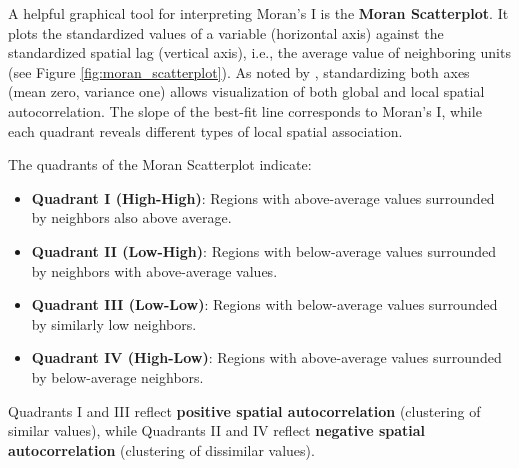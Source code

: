 A helpful graphical tool for interpreting Moran’s I is the \textbf{Moran Scatterplot}. It plots the standardized values of a variable (horizontal axis) against the standardized spatial lag (vertical axis), i.e., the average value of neighboring units (see Figure \ref{fig:moran_scatterplot}). As noted by \citet{anselin1996chapter}, standardizing both axes (mean zero, variance one) allows visualization of both global and local spatial autocorrelation. The slope of the best-fit line corresponds to Moran’s I, while each quadrant reveals different types of local spatial association.

The quadrants of the Moran Scatterplot indicate:

\begin{itemize}
  \item \textbf{Quadrant I (High-High)}: Regions with above-average values surrounded by neighbors also above average.
  \item \textbf{Quadrant II (Low-High)}: Regions with below-average values surrounded by neighbors with above-average values.
  \item \textbf{Quadrant III (Low-Low)}: Regions with below-average values surrounded by similarly low neighbors.
  \item \textbf{Quadrant IV (High-Low)}: Regions with above-average values surrounded by below-average neighbors.
\end{itemize}

Quadrants I and III reflect \textbf{positive spatial autocorrelation} (clustering of similar values), while Quadrants II and IV reflect \textbf{negative spatial autocorrelation} (clustering of dissimilar values).


